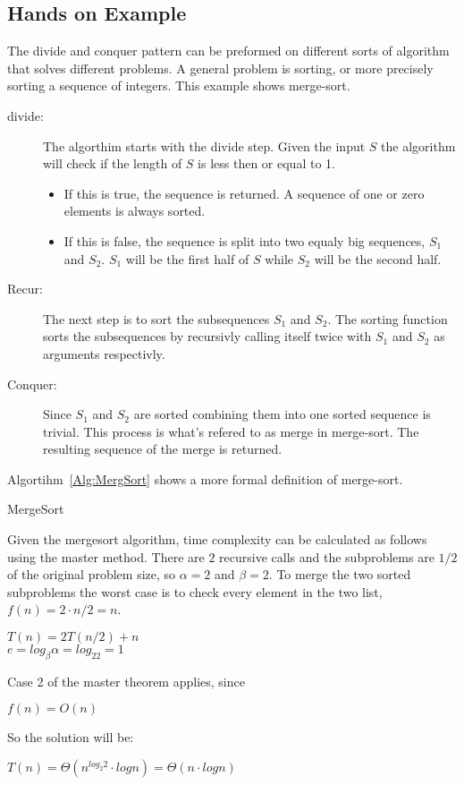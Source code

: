 \subsection{Hands on Example}
The divide and conquer pattern can be preformed on different sorts of algorithm
that solves different problems. A general problem is sorting, or more precisely
sorting a sequence of integers. This example shows merge-sort.

\begin{description}
\item[divide:] The algorthim starts with the divide step. Given the input $S$ the algorithm
will check if the length of $S$ is less then or equal to 1.
\begin{itemize}
\item If this is true, the sequence is returned. A sequence of one or zero
elements is always sorted.
\item If this is false, the sequence is split into two equaly big sequences,
$S_1$ and $S_2$. $S_1$ will be the first half of $S$ while $S_2$ will be the
second half.
\end{itemize}
\item[Recur:] The next step is to sort the subsequences $S_1$ and $S_2$. The sorting
function sorts the subsequences by recursivly calling itself twice with $S_1$ and
$S_2$ as arguments respectivly.
\item[Conquer:] Since $S_1$ and $S_2$ are sorted combining them into one sorted
sequence is trivial. This process is what's refered to as merge in merge-sort.
The resulting sequence of the merge is returned.
\end{description}
Algortihm~\ref{Alg:MergSort} shows a more formal definition of merge-sort.

\begin{algorithm}
\DontPrintSemicolon
{}
\caption{MergeSort}
\label{Alg:MergSort}
\end{algorithm}

Given the mergesort algorithm, time complexity can be calculated as follows
using the master method. There are $2$ recursive calls and the subproblems are
$1/2$ of the original problem size, so $\alpha=2$ and $\beta=2$. To merge the
two sorted subproblems the worst case is to check every element in the two list,
$f(n) = 2 \cdot n/2 = n$.
\begin{center}
$T(n) = 2T(n/2) + n$\\
$e=log_\beta\alpha=log_22=1$
\end{center}
Case 2 of the master theorem applies, since
\begin{center}
$f(n) = O(n)$
\end{center}
So the solution will be:
\begin{center}
$T(n) = \Theta(n^{log_2 2} \cdot log n) = \Theta(n \cdot log n)$
\end{center}


